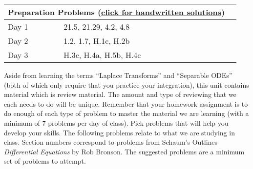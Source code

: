 \begin{center}
\begin{tabular}{ll|l}
\multicolumn{2}{c}{Preparation Problems (\href{https://ilearn.byui.edu/bbcswebdav/institution/Physical\_Sci\_Eng/Mathematics/Personal\%20Folders/WoodruffB/316/01-Review-Preparation-Solutions.pdf}{click for handwritten solutions})}
\\
\hline\hline
Day 1&
21.5, 
21.29, 
4.2, 
4.8
\\ \hline
Day 2&
1.2, 
1.7, 
H.1c, 
H.2b
\\ \hline
Day 3&
H.3c,
H.4a, 
H.5b, 
H.4c
\\ \hline
\end{tabular}
\end{center}


Aside from learning the terms ``Laplace Transforms'' and ``Separable ODEs'' (both of which only require that you practice your integration), this unit contains material which is review material.  The amount and type of reviewing that we each needs to do will be unique.   Remember that your homework assignment is to do enough of each type of problem to master the material we are learning (with a minimum of 7 problems per day of class). Pick problems that will help you develop your skills.
The following problems relate to what we are studying in class.
Section numbers correspond to problems from Schaum's Outlines \textit{Differential Equations} by Rob Bronson. The suggested problems are a minimum set of problems to attempt. 

